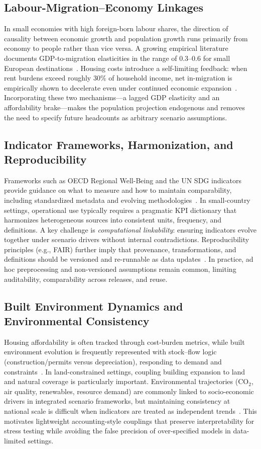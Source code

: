 \documentclass{article}
\begin{document}
\subsection{Labour-Migration--Economy Linkages}
In small economies with high foreign-born labour shares, the direction of
causality between economic growth and population growth runs primarily from
economy to people rather than vice versa. A growing empirical literature
documents GDP-to-migration elasticities in the range of 0.3--0.6 for small
European destinations~\cite{imf2025andorra,worldbank2024}. Housing costs
introduce a self-limiting feedback: when rent burdens exceed roughly 30\% of
household income, net in-migration is empirically shown to decelerate even
under continued economic expansion~\cite{Sa2015,Diamond2016}. Incorporating
these two mechanisms---a lagged GDP elasticity and an affordability
brake---makes the population projection endogenous and removes the need to
specify future headcounts as arbitrary scenario assumptions.

\subsection{Indicator Frameworks, Harmonization, and Reproducibility}
Frameworks such as OECD Regional Well-Being and the UN SDG indicators provide
guidance on what to measure and how to maintain comparability, including
standardized metadata and evolving
methodologies~\cite{oecdregionalwellbeing,unstatsSDGmetadata}. In small-country
settings, operational use typically requires a pragmatic KPI dictionary that
harmonizes heterogeneous sources into consistent units, frequency, and
definitions. A key challenge is \emph{computational linkability}: ensuring
indicators evolve together under scenario drivers without internal
contradictions. Reproducibility principles (e.g., FAIR) further imply that
provenance, transformations, and definitions should be versioned and re-runnable
as data updates~\cite{wilkinson2016fair}. In practice, ad hoc preprocessing and
non-versioned assumptions remain common, limiting auditability, comparability
across releases, and reuse.

\subsection{Built Environment Dynamics and Environmental Consistency}
Housing affordability is often tracked through cost-burden metrics, while built
environment evolution is frequently represented with stock--flow logic
(construction/permits versus depreciation), responding to demand and
constraints~\cite{eurostatHousingCostOverburden}. In land-constrained settings,
coupling building expansion to land and natural coverage is particularly
important. Environmental trajectories (CO$_2$, air quality, renewables, resource
demand) are commonly linked to socio-economic drivers in integrated scenario
frameworks, but maintaining consistency at national scale is difficult when
indicators are treated as independent trends~\cite{riahi2017ssps}. This
motivates lightweight accounting-style couplings that preserve interpretability
for stress testing while avoiding the false precision of over-specified models in
data-limited settings.
\end{document}
